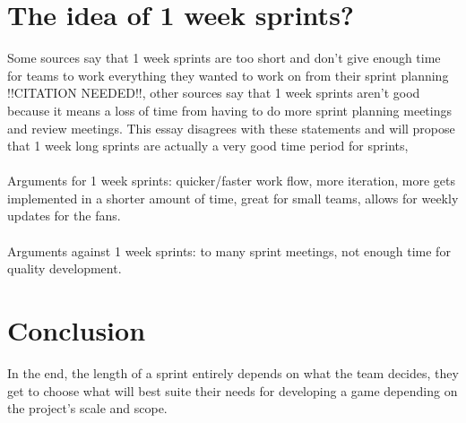 \documentclass{scrartcl}
\begin{document}
\section{The idea of 1 week sprints?}
Some sources say that 1 week sprints are too short and don't give enough time for teams to work everything they wanted to work on from their sprint planning !!CITATION NEEDED!!, other sources say that 1 week sprints aren't good because it means a loss of time from having to do more sprint planning meetings and review meetings. This essay disagrees with these statements and will propose that 1 week long sprints are actually a very good time period for sprints,
\\~\\
Arguments for 1 week sprints: quicker/faster work flow, more iteration, more gets implemented in a shorter amount of time, great for small teams, allows for weekly updates for the fans.
\\~\\
Arguments against 1 week sprints: to many sprint meetings, not enough time for quality development.

\section{Conclusion}
\iffalse
Write your conclusion here. The conclusion should do more than summarise the essay, making clear the contribution of the work and highlighting key points, limitations, and outstanding questions. It should not introduce any new content or information.
\fi
In the end, the length of a sprint entirely depends on what the team decides, they get to choose what will best suite their needs for developing a game depending on the project's scale and scope.


\end{document}
